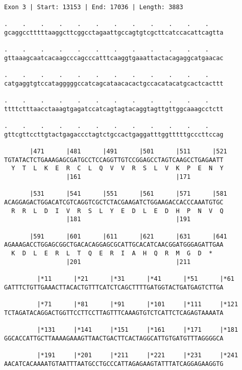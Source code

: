 \documentclass{article}
\begin{document}
\begin{Verbatim}[fontfamily=courier]
Exon 3 | Start: 13153 | End: 17036 | Length: 3883

.    .    .    .    .    .    .    .    .    .    .    .    
gcaggcctttttaaggcttcggcctagaattgccagtgtcgcttcatccacattcagtta

.    .    .    .    .    .    .    .    .    .    .    .    
gttaaagcaatcacaagcccagcccatttcaaggtgaaattactacagaggcatgaacac

.    .    .    .    .    .    .    .    .    .    .    .    
catgaggtgtccatagggggccatcagcataacacactgccacatacatgcactcacttt

.    .    .    .    .    .    .    .    .    .    .    .    
ttttctttaacctaaagtgagatccatcagtagtacaggtagttgttggcaaagcctctt

.    .    .    .    .    .    .    .    .    .    .    .    
gttcgttccttgtactgagaccctagtctgccactgaggatttggtttttgcccttccag

       |471      |481      |491      |501      |511      |521
TGTATACTCTGAAAGAGCGATGCCTCCAGGTTGTCCGGAGCCTAGTCAAGCCTGAGAATT
  Y  T  L  K  E  R  C  L  Q  V  V  R  S  L  V  K  P  E  N  Y
                 |161                          |171         

       |531      |541      |551      |561      |571      |581
ACAGGAGACTGGACATCGTCAGGTCGCTCTACGAAGATCTGGAAGACCACCCAAATGTGC
  R  R  L  D  I  V  R  S  L  Y  E  D  L  E  D  H  P  N  V  Q
                 |181                          |191         

       |591      |601      |611      |621      |631      |641
AGAAAGACCTGGAGCGGCTGACACAGGAGCGCATTGCACATCAACGGATGGGAGATTGAA
  K  D  L  E  R  L  T  Q  E  R  I  A  H  Q  R  M  G  D  *   
                 |201                          |211         

         |*11      |*21      |*31      |*41      |*51      |*61
GATTTCTGTTGAAACTTACACTGTTTCATCTCAGCTTTTGATGGTACTGATGAGTCTTGA

         |*71      |*81      |*91      |*101     |*111     |*121
TCTAGATACAGGACTGGTTCCTTCCTTAGTTTCAAAGTGTCTCATTCTCAGAGTAAAATA

         |*131     |*141     |*151     |*161     |*171     |*181
GGCACCATTGCTTAAAAGAAAGTTAACTGACTTCACTAGGCATTGTGATGTTTAGGGGCA

         |*191     |*201     |*211     |*221     |*231     |*241
AACATCACAAAATGTAATTTAATGCCTGCCCATTAGAGAAGTATTTATCAGGAGAAGGTG

\end{Verbatim}
\newpage
\end{document}
